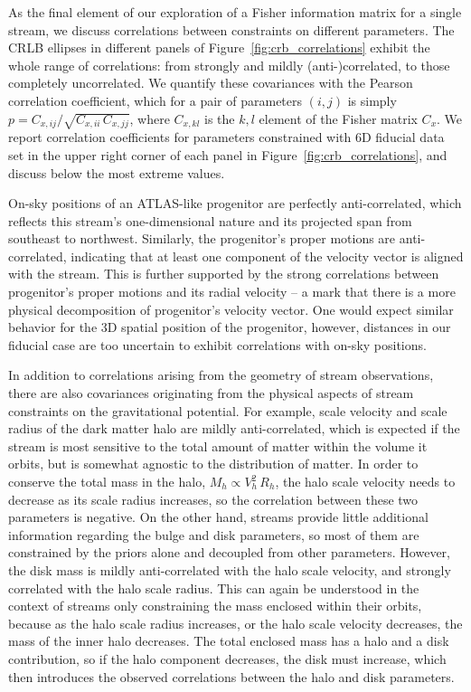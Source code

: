\documentclass[modern]{aastex61}
\begin{document}
As the final element of our exploration of a Fisher information matrix for a single stream, we discuss correlations between constraints on different parameters.
The CRLB ellipses in different panels of Figure~\ref{fig:crb_correlations} exhibit the whole range of correlations: from strongly and mildly (anti-)correlated, to those completely uncorrelated.
We quantify these covariances with the Pearson correlation coefficient, which for a pair of parameters $(i,j)$ is simply $p = C_{x,ij} / \sqrt{C_{x,ii}\,C_{x,jj}}$, where $C_{x,kl}$ is the $k,l$ element of the Fisher matrix $C_x$.
We report correlation coefficients for parameters constrained with 6D fiducial data set in the upper right corner of each panel in Figure~\ref{fig:crb_correlations}, and discuss below the most extreme values.

On-sky positions of an ATLAS-like progenitor are perfectly anti-correlated, which reflects this stream's one-dimensional nature and its projected span from southeast to northwest.
Similarly, the progenitor's proper motions are anti-correlated, indicating that at least one component of the velocity vector is aligned with the stream.
This is further supported by the strong correlations between progenitor's proper motions and its radial velocity -- a mark that there is a more physical decomposition of progenitor's velocity vector.
One would expect similar behavior for the 3D spatial position of the progenitor, however, distances in our fiducial case are too uncertain to exhibit correlations with on-sky positions.

In addition to correlations arising from the geometry of stream observations, there are also covariances originating from the physical aspects of stream constraints on the gravitational potential.
For example, scale velocity and scale radius of the dark matter halo are mildly anti-correlated, which is expected if the stream is most sensitive to the total amount of matter within the volume it orbits, but is somewhat agnostic to the distribution of matter.
In order to conserve the total mass in the halo, $M_h \propto V_h^2\,R_h$, the halo scale velocity needs to decrease as its scale radius increases, so the correlation between these two parameters is negative.
On the other hand, streams provide little additional information regarding the bulge and disk parameters, so most of them are constrained by the priors alone and decoupled from other parameters.
However, the disk mass is mildly anti-correlated with the halo scale velocity, and strongly correlated with the halo scale radius.
This can again be understood in the context of streams only constraining the mass enclosed within their orbits, because as the halo scale radius increases, or the halo scale velocity decreases, the mass of the inner halo decreases.
The total enclosed mass has a halo and a disk contribution, so if the halo component decreases, the disk must increase, which then introduces the observed correlations between the halo and disk parameters. 
\end{document}

